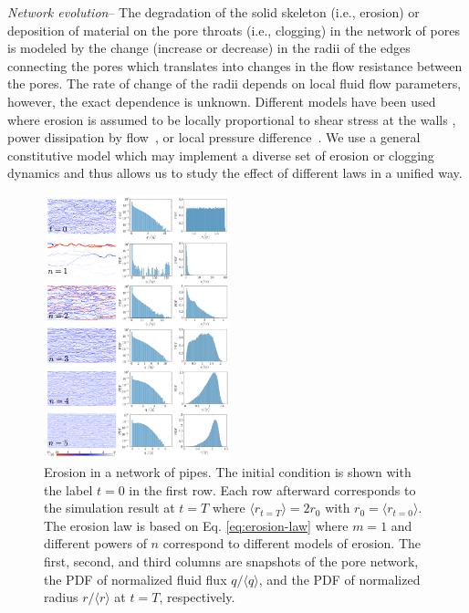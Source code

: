 \documentclass[%
reprint,
 amsmath,amssymb,
 aps,
prl,
]{revtex4-1}
\begin{document}
\textit{Network evolution}-- The degradation of the solid skeleton (i.e., erosion) or deposition of material on the pore throats (i.e., clogging) in the network of pores is modeled by the change (increase or decrease) in the radii of the edges connecting the pores which translates into changes in the flow resistance between the pores. The rate of change of the radii depends on local fluid flow parameters, however, the exact dependence is unknown. Different models have been used where erosion is assumed to be locally proportional to shear stress at the walls \cite{jager2017channelization,ristroph2012sculpting,hacking1996shear,wan2004investigation}, power dissipation by flow~\cite{steeb2007modeling,marot2012study,sibille2015internal}, or local pressure difference~\cite{derr2020flow,mahadevan2012flow}. We use a general constitutive  model which may implement a diverse set of erosion or clogging dynamics and thus allows us to study the effect of different laws in a unified way. 

\begin{figure}[!h]
    \includegraphics[width = 0.48\textwidth]{Fig2_.pdf}
    \caption{Erosion in a network of pipes. The initial condition is shown with the label $t=0$ in the first row. Each row afterward corresponds to the {simulation result at $t=T$ where  $\langle r_{t=T}\rangle=2r_0$ with $r_0 = \langle r_{t=0}\rangle$}. The erosion law is based on Eq. \eqref{eq:erosion-law}  {where $m=1$ and different powers of $n$ correspond to different models of erosion}. {The first, second, and third columns are snapshots of the pore network, the PDF of normalized fluid flux $q/\langle q \rangle$, and  the PDF of normalized radius $r/\langle r\rangle$ at $t=T$, respectively}.} \label{fig:fig2}
\end{figure}
%
% 
\end{document}
